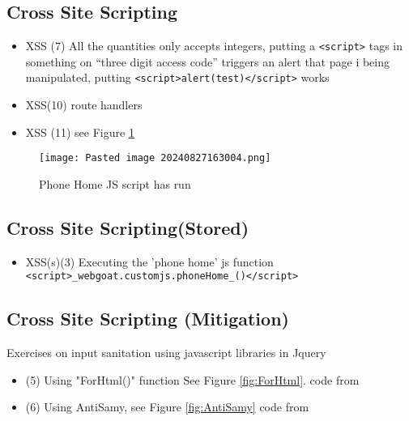 \documentclass[
	letterpaper, %
	10pt, %
	unnumberedsections, %
	twoside, %
]{APAAssignment}
\begin{document}
\begin{appendices}
\subsection{Cross Site Scripting}\label{cross-site-scripting}

\begin{itemize}
\item{XSS (7) All the quantities only accepts integers, putting a
\texttt{\textless{}script\textgreater{}} tags in something on ``three
digit access code'' triggers an alert that page i being manipulated,
putting
\texttt{\textless{}script\textgreater{}alert(test)\textless{}/script\textgreater{}}
works}

\item{XSS(10) route handlers}

\item{XSS (11) see Figure \ref{fig:Result11}}
\end{itemize}


\begin{figure}[!htb] %
	\centering
	\texttt{[image: Pasted image 20240827163004.png]}
	\caption{Phone Home JS script has run}
	\label{fig:Result11}
\end{figure}


\subsection{Cross Site Scripting(Stored)}\label{cross-site-scripting-stored}

\begin{itemize}
	\item{XSS(s)(3) Executing the 'phone home' js function \texttt{\textless{}script\textgreater{}\_webgoat.customjs.phoneHome\_()\textless{}/script\textgreater{}}}
\end{itemize}


\subsection{Cross Site Scripting (Mitigation)}\label{cross-site-scripting-mitigation}
Exercises on input sanitation using javascript libraries in Jquery

\begin{itemize}
	\item (5) Using "ForHtml()" function See Figure \ref{fig:ForHtml}. code from \cite{CycubicsDocsWebGoat}
	\item (6) Using AntiSamy, see Figure \ref{fig:AntiSamy} code from \cite{CycubicsDocsWebGoat}
\end{itemize}



\end{appendices}
\end{document}
